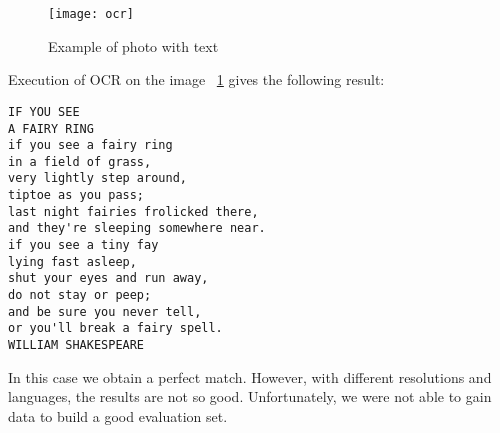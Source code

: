 \begin{figure}[H]
\centering
\texttt{[image: ocr]}
\caption{Example of photo with text}
\label{testOCR}
\end{figure}

Execution of OCR on the image~ \ref{testOCR} gives the following result:
\begin{lstlisting}
IF YOU SEE
A FAIRY RING
if you see a fairy ring
in a field of grass,
very lightly step around,
tiptoe as you pass;
last night fairies frolicked there,
and they're sleeping somewhere near.
if you see a tiny fay
lying fast asleep,
shut your eyes and run away,
do not stay or peep;
and be sure you never tell,
or you'll break a fairy spell.
WILLIAM SHAKESPEARE
\end{lstlisting}

In this case we obtain a perfect match. However, with different resolutions and languages, the results are not so good. Unfortunately, we were not able to gain data to build a good evaluation set.